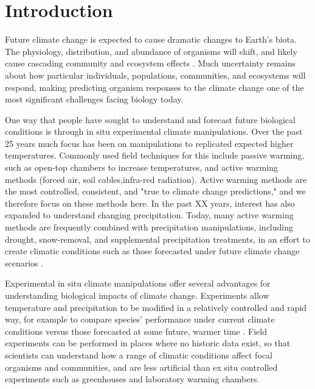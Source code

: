 \documentclass{article}
\begin{document}
\section {Introduction}
\par Future climate change is expected to cause dramatic changes to Earth's biota. The physiology, distribution, and abundance of organisms will shift, and likely cause cascading community and ecosystem effects \citep{thomas2004,parmesan2006,sheldon2011,urban2012}. Much uncertainty remains about how particular individuals, populations, communities, and ecosystems will respond, making predicting organism responses to the climate change one of the most significant challenges facing biology today.
\par One way that people have sought to understand and forecast future biological conditions is through in situ experimental climate manipulations. Over the past 25 years much focus has been on manipulations to replicated expected higher temperatures. Commonly used field techniques for this include passive warming, such as open-top chambers to increase temperatures, and active warming methods (forced air, soil cables,infra-red radiation). Active warming methods are the most controlled, consistent, and "true to climate change predictions," \citep{aronson2009,wolkovich2012} and we therefore focus on these methods here. In the past XX years, interest has also expanded to understand changing precipitation. Today, many active warming methods are frequently combined with precipitation manipulations, including drought, snow-removal, and supplemental precipitation treatments, in an effort to create climatic conditions such as those forecasted under future climate change scenarios \citep{price1998,cleland2006,sherry2007,rollinson2012}.
\par Experimental in situ climate manipulations offer several advantages for understanding biological impacts of climate change. Experiments allow temperature and precipitation to be modified in a relatively controlled and rapid way, for example to compare species' performance under current climate conditions versus those forecasted at some future, warmer time \citep[e.g.][]{pelini2014,rollinson2012,jamieson2015}. Field experiments can be performed in places where no historic data exist, so that scientists can understand how a range of climatic conditions affect focal organisms and communities, and are less artificial than ex situ controlled experiments such as greenhouses and laboratory warming chambers.
\end{document}
